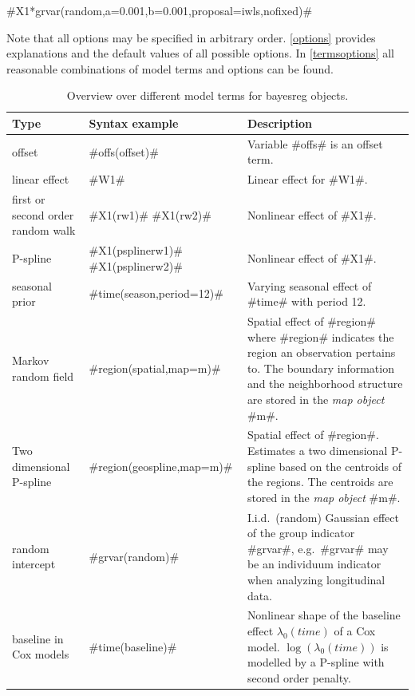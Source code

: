 #X1*grvar(random,a=0.001,b=0.001,proposal=iwls,nofixed)#

Note that all options may be specified in arbitrary order.
\autoref{options} provides explanations and the default values of
all possible options. In \autoref{termsoptions} all reasonable
combinations of model terms and options can be found.




\begin{table}[ht] \footnotesize
\begin{center}
\begin{tabular}{|p{2.8cm}|p{3.6cm}|p{7.1cm}|}
\hline
{\bf Type} & {\bf Syntax example} & {\bf Description} \\
\hline \hline
offset & #offs(offset)#  & Variable #offs# is an offset term. \\
\hline
linear effect & #W1#  & Linear effect for #W1#. \\
\hline
first or second order random walk &   #X1(rw1)#  \newline  #X1(rw2)#  & Nonlinear effect of #X1#. \\
\hline
P-spline &  #X1(psplinerw1)#   \newline  #X1(psplinerw2)#  & Nonlinear effect of #X1#.  \\
\hline
seasonal prior & #time(season,period=12)# & Varying seasonal effect of #time# with period 12. \\
\hline Markov random \newline field &  #region(spatial,map=m)#  &
Spatial effect of #region# where #region# indicates the region an
observation pertains to. The boundary information and the
neighborhood structure are stored in the {\em map object}
#m#. \\
\hline Two dimensional \newline P-spline &
#region(geospline,map=m)# & Spatial effect of #region#. Estimates
a two dimensional P-spline
based on the centroids of the regions. The centroids are stored in the {\em map object} #m#. \\
\hline random intercept &  #grvar(random)# & I.i.d.~(random)
Gaussian effect of the group indicator #grvar#,
e.g.~#grvar# may be an individuum indicator when analyzing longitudinal data.  \\
\hline baseline in Cox \newline models & #time(baseline)# &
Nonlinear shape
of the baseline effect $\lambda_0(time)$ of a Cox model. $\log(\lambda_0(time))$ is modelled by a P-spline with second order penalty. \\
\hline
\end{tabular}
{\em\caption {\label{terms} Overview over different model terms
for bayesreg objects.}}
\end{center}
\end{table}


